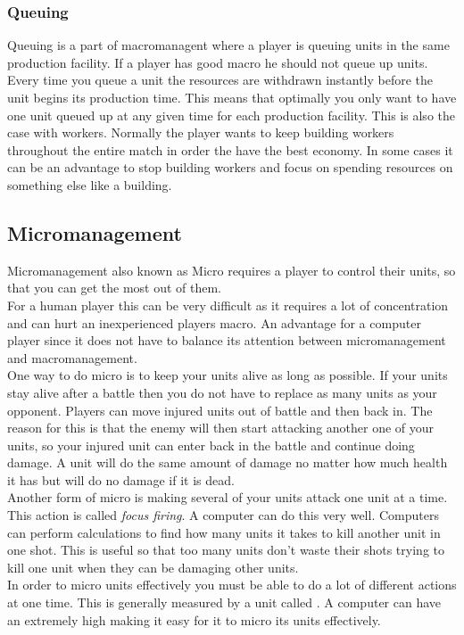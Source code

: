 			\subsubsection{Queuing}
				Queuing is a part of macromanagent where a player is queuing units in the same production facility.	If a player has good macro he should not queue up units. 
				Every time you queue a unit the resources are withdrawn instantly before the unit begins its production time. This means that optimally you only want to have one unit
 				queued up at any given time for each production facility. This is also the case with workers. Normally the player wants to keep building workers throughout the entire match
				in order the have the best economy. In some cases it can be an advantage to stop building workers and focus on spending resources on something else like a building.
				
				
	\subsection{Micromanagement}
		Micromanagement also known as Micro requires a player to control their units, so that you can get the most out of them.\\
		
		For a human player this can be very difficult as it requires a lot of concentration and can hurt an inexperienced players macro. 
		An advantage for a computer player since it does not have to balance its attention between micromanagement and macromanagement.\\
		
		One way to do micro is to keep your units alive as long as possible. 
		If your units stay alive after a battle then you do not have to replace as many units as your opponent. 
		Players can move injured units out of battle and then back in. 
		The reason for this is that the enemy will then start attacking another one of your 
		units, so your injured unit can enter back in the battle and continue doing damage. 
		A unit will do the same amount of damage no matter how much health it has but will do no damage if it is dead.\\
		
		Another form of micro is making several of your units attack one unit at a time. This action is called \textit{focus firing}.
		A computer can do this very well. Computers can perform calculations to find how many units it takes to kill another unit in one shot.
		This is useful so that too many units don't waste their shots trying to kill one unit when they can be damaging other units.\\
		In order to micro units effectively you must be able to do a lot of different actions at one time. 
		This is generally measured by a unit called \abapm. 
		A computer can have an extremely high \abapm making it easy for it to micro its units effectively.

